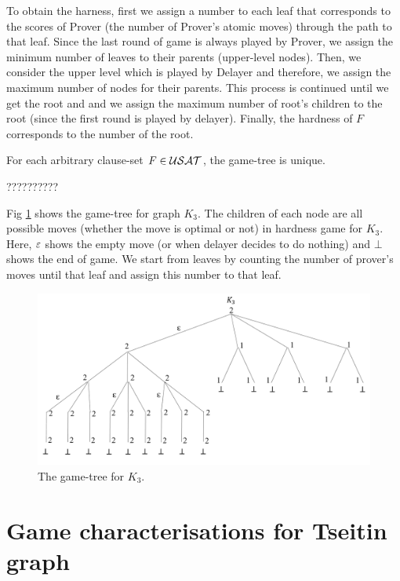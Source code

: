 \documentclass{report}
\begin{document}
To obtain the harness, first we assign a number to each leaf that corresponds to the scores of Prover (the number of Prover's atomic moves) through the path to that leaf. Since the last round of game is always played by Prover, we assign the minimum number of leaves to their parents (upper-level nodes). Then, we consider the upper level which is played by Delayer and therefore, we assign the maximum number of nodes for their parents. This process is continued until we get the root and and we assign the maximum number of root's children to the root (since the first round is played by delayer). Finally, the hardness of $F$ corresponds to the number of the root.

\begin{lem}\label{lem:game2}
For each arbitrary clause-set $F \in \mathcal{USAT}$, the game-tree is unique.
\end{lem}
\begin{prf}
??????????
\end{prf}

\begin{examp}\label{exp:gg1}
Fig \ref{fig:gg1} shows the game-tree for graph $K_3$. The children of each node are all possible moves (whether the move is optimal or not) in hardness game for $K_3$. Here, $\varepsilon $ shows the empty move (or when delayer decides to do nothing) and $\bot$ shows the end of game. We start from leaves by counting the number of prover's moves until that leaf and assign this number to that leaf. 
   \begin{figure}
   \begin{center}
   \includegraphics[scale =0.45]{gg1.png}
   \caption{The game-tree for $K_3$.}
   \label{fig:gg1}
   \end{center}
   \end{figure}
\end{examp}

\section{Game characterisations for Tseitin graph}
\label{sec:hd-game-graph}
\end{document}
